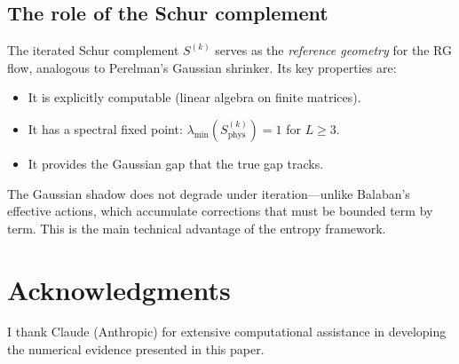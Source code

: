 \documentclass[11pt]{article}
\theoremstyle{definition}
\begin{document}
\subsection{The role of the Schur complement}

The iterated Schur complement $S^{(k)}$ serves as the 
\emph{reference geometry} for the RG flow, analogous to Perelman's 
Gaussian shrinker.  Its key properties are:
\begin{itemize}
\item It is explicitly computable (linear algebra on finite matrices).
\item It has a spectral fixed point: 
  $\lambda_{\min}(S^{(k)}_{\mathrm{phys}}) = 1$ for $L \geq 3$.
\item It provides the Gaussian gap that the true gap tracks.
\end{itemize}

The Gaussian shadow does not degrade under iteration---unlike 
Balaban's effective actions, which accumulate corrections that 
must be bounded term by term.  This is the main technical advantage 
of the entropy framework.

\section*{Acknowledgments}

I thank Claude (Anthropic) for extensive computational assistance 
in developing the numerical evidence presented in this paper.


\end{document}
